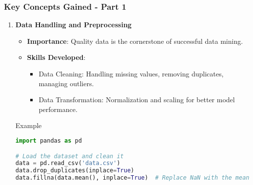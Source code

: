 \documentclass[aspectratio=169]{beamer}
\begin{document}
\begin{frame}[fragile]
    \frametitle{Key Concepts Gained - Part 1}
    \begin{enumerate}
        \item \textbf{Data Handling and Preprocessing}
        \begin{itemize}
            \item \textbf{Importance}: Quality data is the cornerstone of successful data mining.
            \item \textbf{Skills Developed}:
            \begin{itemize}
                \item Data Cleaning: Handling missing values, removing duplicates, managing outliers.
                \item Data Transformation: Normalization and scaling for better model performance.
            \end{itemize}
        \end{itemize}
        \begin{block}{Example}
        \begin{lstlisting}[language=Python]
import pandas as pd

# Load the dataset and clean it
data = pd.read_csv('data.csv')
data.drop_duplicates(inplace=True)
data.fillna(data.mean(), inplace=True)  # Replace NaN with the mean
        \end{lstlisting}
        \end{block}
    \end{enumerate}
\end{frame}
\end{document}
